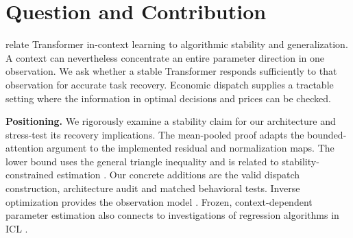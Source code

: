 \documentclass{article}
\newcommand{\pct}[1]{#1\%}
\begin{document}
\printAffiliationsAndNotice{}

\begin{abstract}
We examine how a frozen Transformer balances replacement stability
with responsiveness to informative observations. For the implemented
mean-pooled encoder we prove a \(C/m\) replacement bound, including
residual connections and LayerNorm. We construct two individually
identifying economic-dispatch contexts differing in one price, giving
a recovery error floor for any estimator obeying that bound. Across
three seeds, a matched price intervention produces a \(14.1\times\)
larger Transformer response under high leverage, while its response
on the identifying pair recovers only \pct{47.4} of the true parameter
difference at \(m=64\). Stability and accurate recovery depend on how
the context distributes its identifying information.
\end{abstract}

\section{Question and Contribution}
\citet{li} relate Transformer in-context learning to algorithmic
stability and generalization. A context can nevertheless concentrate
an entire parameter direction in one observation. We ask whether a
stable Transformer responds sufficiently to that observation for
accurate task recovery. Economic dispatch supplies a tractable setting
where the information in optimal decisions and prices can be checked.

\textbf{Positioning.} We rigorously examine a stability claim for our
architecture and stress-test its recovery implications. The
mean-pooled proof adapts the bounded-attention argument to the
implemented residual and normalization maps. The lower bound uses
the general triangle inequality and is related to stability-constrained
estimation \citep{clb}. Our concrete additions are the valid dispatch
construction, architecture audit and matched behavioral tests.
Inverse optimization provides the observation model
\citep{keshavarz,liang}. Frozen, context-dependent parameter estimation
also connects to investigations of regression algorithms in ICL
\citep{akyurek}.
\end{document}
